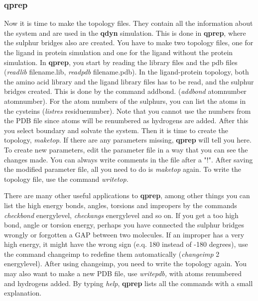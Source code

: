 \documentclass[a4paper,10pt]{article}
\begin{document}
\subsubsection{\textbf{qprep}}
Now  it is  time to  make  the topology  files. They  contain all  the
information  about  the  system  and are  used  in  the  \textbf{qdyn}
simulation.  This is done in \textbf{qprep}, where the sulphur bridges
also are  created.  You have to  make two topology files,  one for the
ligand  in protein  simulation  and  one for  the  ligand without  the
protein  simulation.   In \textbf{qprep},  you  start  by reading  the
library  files  and  the  pdb  files  (\textit{readlib  }filename.lib,
\textit{readpdb }filename.pdb).  In the ligand-protein  topology, both
the amino  acid library and the  ligand library files has  to be read,
and  the  sulphur  bridges  created.  This  is  done  by  the  command
addbond.  (\textit{addbond  }atomnumber   atomnumber).  For  the  atom
numbers  of the  sulphurs,  you can  list the  atoms  in the  cysteins
(\textit{listres }residuenumber). Note that you cannot use the numbers
from the  PDB file  since atoms  will be  renumbered as  hydrogens are
added. After this you select boundary  and solvate the system. Then it
is time  to create  the topology, \textit{maketop}.  If there  are any
parameters missing, \textbf{qprep}  will tell you here.  To create new
parameters, edit  the parameter  file in  a way that  you can  see the
changes  made. You  can  always write  comments in  the  file after  a
"!". After saving  the modified parameter file, all you  need to do is
\textit{maketop }again.  To write the  topology file, use  the command
\textit{writetop.}

There  are many  other  useful applications  to \textbf{qprep},  among
other things you can list the  high energy bonds, angles, torsions and
impropers    by   the    commands   \textit{checkbond    }energylevel,
\textit{checkangs }energylevel and so on. If  you get a too high bond,
angle  or  torsion energy,  perhaps  you  have connected  the  sulphur
bridges  wrongly or  forgotten a  GAP  between two  molecules.  If  an
improper  has  a very  high  energy,  it  might  have the  wrong  sign
(e.q.  180 instead  of -180  degrees),  use the  command changeimp  to
redefine them automatically (\textit{changeimp} 2 energylevel).  After
using changeimp,  you need to write  the topology again. You  may also
want  to  make a  new  PDB  file,  use \textit{writepdb,  }with  atoms
renumbered   and    hydrogens   added.   By    typing   \textit{help},
\textbf{qprep} lists all the commands with a small explanation.
\end{document}
